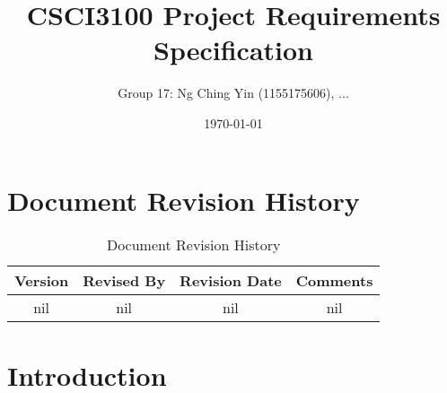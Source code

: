 \documentclass[11pt]{article}
\title{CSCI3100 Project Requirements Specification}
\author{Group 17: Ng Ching Yin (1155175606), ...}
\date{\today}
\begin{document}
\maketitle

{
    \hypersetup{linkcolor=black}
    \tableofcontents
}

\newpage

\section{Document Revision History}
\begin{table}[h]
    \centering
    \caption{Document Revision History}
    \begin{tabular}{cccc}
        \toprule
        Version & Revised By & Revision Date & Comments \\
        \midrule
        nil & nil & nil & nil \\
        \bottomrule
    \end{tabular}
    \label{tab:docs_rev_hist}
\end{table}

\section{Introduction}
\end{document}
